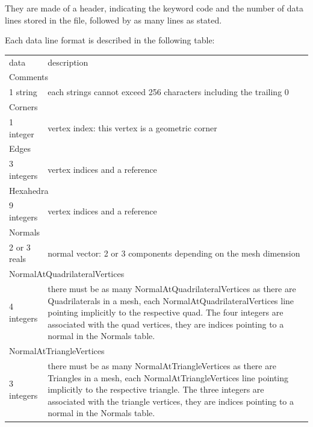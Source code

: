 \documentclass[a4paper,12pt]{article}
\begin{document}
They are made of a header, indicating the keyword code and the number of data lines stored in the file, followed by as many lines as stated.

Each data line format is described in the following table:

\setlongtables
\begin{longtable}{|m{4cm}|m{11cm}|}
\endhead
\endfoot

\hline
\multicolumn{2}{|l|}{keyword} \\
\hline
data & description \\
\hline\hline

\multicolumn{2}{|l|}{Comments} \\
\hline
1 string & each strings cannot exceed 256 characters including the trailing 0 \\
\hline\hline

\multicolumn{2}{|l|}{Corners} \\
\hline
1 integer & vertex index: this vertex is a geometric corner \\
\hline\hline

\multicolumn{2}{|l|}{Edges} \\
\hline
3 integers & vertex indices and a reference \\
\hline\hline

\multicolumn{2}{|l|}{Hexahedra} \\
\hline
9 integers & vertex indices and a reference \\
\hline\hline

\multicolumn{2}{|l|}{Normals} \\
\hline
2 or 3 reals & normal vector: 2 or 3 components depending on the mesh dimension \\
\hline\hline

\multicolumn{2}{|l|}{NormalAtQuadrilateralVertices} \\
\hline
4 integers & there must be as many NormalAtQuadrilateralVertices as there are Quadrilaterals in a mesh, each NormalAtQuadrilateralVertices line pointing implicitly to the respective quad. The four integers are associated with the quad vertices, they are indices pointing to a normal in the Normals table. \\
\hline\hline

\multicolumn{2}{|l|}{NormalAtTriangleVertices} \\
\hline
3 integers & there must be as many NormalAtTriangleVertices as there are Triangles in a mesh, each NormalAtTriangleVertices line pointing implicitly to the respective triangle. The three integers are associated with the triangle vertices, they are indices pointing to a normal in the Normals table. \\
\hline\hline


\end{longtable}
\end{document}
